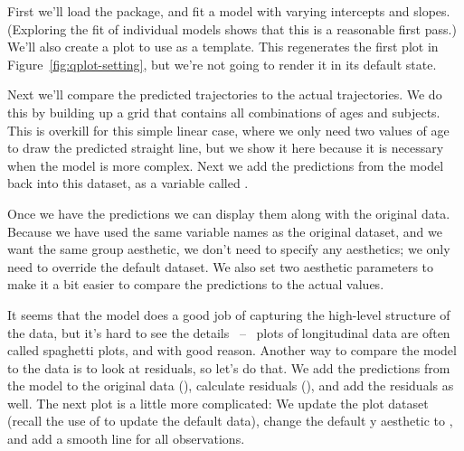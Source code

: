 First we'll load the  package, and fit a model with varying intercepts and slopes.  (Exploring the fit of individual models shows that this is a reasonable first pass.)  We'll also create a plot to use as a template.  This regenerates the first plot in Figure~\ref{fig:qplot-setting}, but we're not going to render it in its default state.

% 


Next we'll compare the predicted trajectories to the actual trajectories.  We do this by building up a grid that contains all combinations of ages and subjects.  This is overkill for this simple linear case, where we only need two values of age to draw the predicted straight line, but we show it here because it is necessary when the model is more complex.  Next we add the predictions from the model back into this dataset, as a variable called .  

% 
% 


Once we have the predictions we can display them along with the original data.  Because we have used the same variable names as the original  dataset, and we want the same group aesthetic, we don't need to specify any aesthetics; we only need to override the default dataset.  We also set two aesthetic parameters to make it a bit easier to compare the predictions to the actual values.

% 


It seems that the model does a good job of capturing the high-level structure of the data, but it's hard to see the details ~--~ plots of longitudinal data are often called spaghetti plots, and with good reason.  Another way to compare the model to the data is to look at residuals, so let's do that.  We add the predictions from the model to the original data (), calculate residuals (), and add the residuals as well.  The next plot is a little more complicated: We update the plot dataset (recall the use of \code{\%+\%} to update the default data), change the default y aesthetic to , and add a smooth line for all observations.

